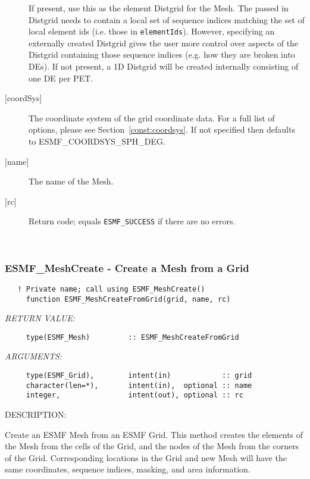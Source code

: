\begin{description}
            If present, use this as the element Distgrid for the Mesh.
            The passed in Distgrid
            needs to contain a local set of sequence indices matching the set of local element ids (i.e. those in {\tt elementIds}).
            However, specifying an externally created Distgrid gives the user more control over aspects of
            the Distgrid containing those sequence indices (e.g. how they are broken into DEs).
            If not present, a 1D Distgrid will be created internally consisting of one DE per PET.
     \item[{[coordSys]}]
           The coordinate system of the grid coordinate data.
           For a full list of options, please see Section~\ref{const:coordsys}.
           If not specified then defaults to ESMF\_COORDSYS\_SPH\_DEG.
     \item [{[name]}]
           The name of the Mesh.
     \item [{[rc]}]
           Return code; equals {\tt ESMF\_SUCCESS} if there are no errors.
     \end{description}
   
 
\mbox{}\hrulefill\ 
 
\subsubsection [ESMF\_MeshCreate] {ESMF\_MeshCreate - Create a Mesh from a Grid}


  
\begin{verbatim}   ! Private name; call using ESMF_MeshCreate()
     function ESMF_MeshCreateFromGrid(grid, name, rc)\end{verbatim}{\em RETURN VALUE:}
\begin{verbatim}     type(ESMF_Mesh)         :: ESMF_MeshCreateFromGrid\end{verbatim}{\em ARGUMENTS:}
\begin{verbatim}     type(ESMF_Grid),        intent(in)            :: grid
     character(len=*),       intent(in),  optional :: name
     integer,                intent(out), optional :: rc
 \end{verbatim}
{\sf DESCRIPTION:\\ }


     Create an ESMF Mesh from an ESMF Grid. This method creates the elements of
    the Mesh from the cells of the Grid, and the nodes of the Mesh from the corners of
    the Grid. Corresponding locations in the Grid and new Mesh will have the same
    coordinates, sequence indices, masking, and area information.
  
